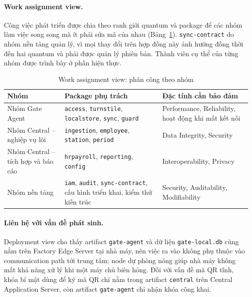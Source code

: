 \paragraph{Work assignment view.} Công việc phát triển được chia theo ranh giới quantum và package để các nhóm làm việc song song mà ít phải sửa mã của nhau (Bảng~\ref{tab:work-assignment}). \texttt{sync-contract} do nhóm nền tảng quản lý, vì mọi thay đổi trên hợp đồng này ảnh hưởng đồng thời đến hai quantum và phải được quản lý phiên bản. Thành viên cụ thể của từng nhóm được trình bày ở phần hiện thực.

\begin{table}[H]
\centering
\caption{Work assignment view: phân công theo nhóm}\label{tab:work-assignment}
\small
\renewcommand{\arraystretch}{1.3}
\begin{tabularx}{\textwidth}{|>{\raggedright\arraybackslash}p{4.2cm}|>{\raggedright\arraybackslash}X|>{\raggedright\arraybackslash}p{5.2cm}|}
\hline
\textbf{Nhóm} & \textbf{Package phụ trách} & \textbf{Đặc tính cần bảo đảm} \\
\hline
Nhóm Gate Agent & \texttt{access}, \texttt{turnstile}, \texttt{localstore}, \texttt{sync}, \texttt{guard} & Performance, Reliability, hoạt động khi mất kết nối \\
\hline
Nhóm Central -- nghiệp vụ lõi & \texttt{ingestion}, \texttt{employee}, \texttt{station}, \texttt{period} & Data Integrity, Security \\
\hline
Nhóm Central -- tích hợp và báo cáo & \texttt{hrpayroll}, \texttt{reporting}, \texttt{config} & Interoperability, Privacy \\
\hline
Nhóm nền tảng & \texttt{iam}, \texttt{audit}, \texttt{sync-contract}, cấu hình triển khai, kiểm thử kiến trúc & Security, Auditability, Modifiability \\
\hline
\end{tabularx}
\end{table}

\paragraph{Liên hệ với vấn đề phát sinh.} Deployment view cho thấy artifact \texttt{gate-agent} và dữ liệu \texttt{gate-local.db} cùng nằm trên Factory Edge Server tại nhà máy, nên việc ra vào không phụ thuộc vào communication path tới trung tâm; node dự phòng nóng giúp nhà máy không mất khả năng xử lý khi một máy chủ biên hỏng. Đối với vấn đề mã QR tĩnh, khóa bí mật dùng để ký mã QR chỉ nằm trong artifact \texttt{central} trên Central Application Server, còn artifact \texttt{gate-agent} chỉ nhận khóa công khai.


